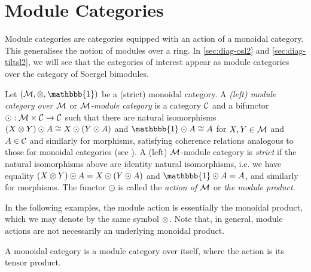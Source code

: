 \section{Module Categories}
\label{sec:module-cat}

Module categories are categories equipped with an action of a monoidal category. This generalises the notion of modules over a ring. In \autoref{sec:diag-osl2} and \autoref{sec:diag-tiltsl2}, we will see that the categories of interest appear as module categories over the category of Soergel bimodules.

\begin{definition}
    Let $(\mcal{M}, \tensor, \mathbbb{1})$ be a (strict) monoidal category. A \textit{(left) module category over $\mathcal{M}$} or \textit{$\mathcal{M}$-module category} is a category $\mathcal{C}$ and a bifunctor $\odot: \mathcal{M} \times \mathcal{C} \to \mathcal{C}$ such that there are natural isomorphisms $(X \otimes Y) \odot A \cong X \odot (Y \odot A)$ and $\mathbbb{1} \odot A \cong A$ for $X,Y \in \mathcal{M}$ and $A \in \mathcal{C}$ and similarly for morphisms, satisfying coherence relations analogous to those for monoidal categories (see \cite[Definition 7.1.2]{tensor-categories}). A (left) $\mathcal{M}$-module category is \textit{strict} if the natural isomorphisms above are identity natural isomorphisms, i.e. we have equality $(X \otimes Y) \odot A = X \odot (Y \odot A)$ and $\mathbbb{1} \odot A = A$, and similarly for morphisms. The functor $\odot$ is called the \textit{action of $\mathcal{M}$} or \textit{the module product}. 
\end{definition}

In the following examples, the module action is essentially the monoidal product, which we may denote by the same symbol $\otimes$. Note that, in general, module actions are not necessarily an underlying monoidal product.

\begin{example}
    A monoidal category is a module category over itself, where the action is its tensor product.
\end{example}

